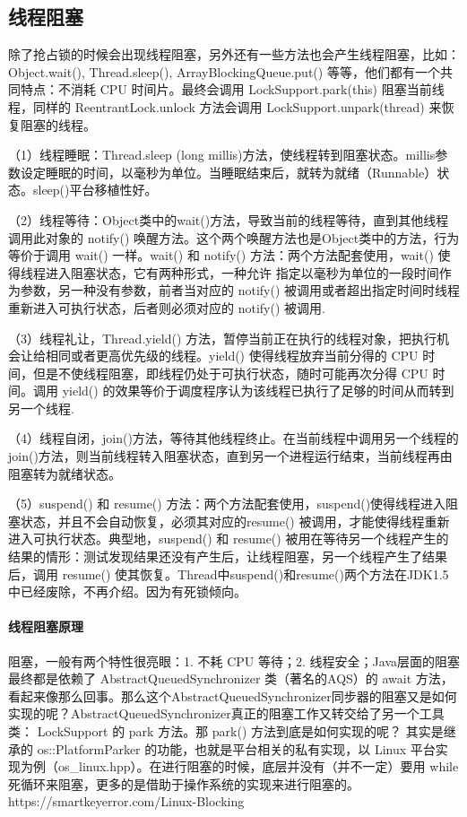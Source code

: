 \documentclass[../../../interview-questions.tex]{subfiles}
\begin{document}
\subsection{线程阻塞}

除了抢占锁的时候会出现线程阻塞，另外还有一些方法也会产生线程阻塞，比如： Object.wait(), Thread.sleep(), ArrayBlockingQueue.put() 等等，他们都有一个共同特点：不消耗 CPU 时间片。最终会调用 LockSupport.park(this) 阻塞当前线程，同样的 ReentrantLock.unlock 方法会调用 LockSupport.unpark(thread) 来恢复阻塞的线程。

（1）线程睡眠：Thread.sleep (long millis)方法，使线程转到阻塞状态。millis参数设定睡眠的时间，以毫秒为单位。当睡眠结束后，就转为就绪（Runnable）状态。sleep()平台移植性好。

（2）线程等待：Object类中的wait()方法，导致当前的线程等待，直到其他线程调用此对象的 notify() 唤醒方法。这个两个唤醒方法也是Object类中的方法，行为等价于调用 wait() 一样。wait() 和 notify() 方法：两个方法配套使用，wait() 使得线程进入阻塞状态，它有两种形式，一种允许 指定以毫秒为单位的一段时间作为参数，另一种没有参数，前者当对应的 notify() 被调用或者超出指定时间时线程重新进入可执行状态，后者则必须对应的 notify() 被调用.

（3）线程礼让，Thread.yield() 方法，暂停当前正在执行的线程对象，把执行机会让给相同或者更高优先级的线程。yield() 使得线程放弃当前分得的 CPU 时间，但是不使线程阻塞，即线程仍处于可执行状态，随时可能再次分得 CPU 时间。调用 yield() 的效果等价于调度程序认为该线程已执行了足够的时间从而转到另一个线程.

（4）线程自闭，join()方法，等待其他线程终止。在当前线程中调用另一个线程的join()方法，则当前线程转入阻塞状态，直到另一个进程运行结束，当前线程再由阻塞转为就绪状态。

（5）suspend() 和 resume() 方法：两个方法配套使用，suspend()使得线程进入阻塞状态，并且不会自动恢复，必须其对应的resume() 被调用，才能使得线程重新进入可执行状态。典型地，suspend() 和 resume() 被用在等待另一个线程产生的结果的情形：测试发现结果还没有产生后，让线程阻塞，另一个线程产生了结果后，调用 resume() 使其恢复。Thread中suspend()和resume()两个方法在JDK1.5中已经废除，不再介绍。因为有死锁倾向。

\paragraph{线程阻塞原理}

阻塞，一般有两个特性很亮眼：1. 不耗 CPU 等待；2. 线程安全；Java层面的阻塞最终都是依赖了 AbstractQueuedSynchronizer 类（著名的AQS）的 await 方法，看起来像那么回事。那么这个AbstractQueuedSynchronizer同步器的阻塞又是如何实现的呢？AbstractQueuedSynchronizer真正的阻塞工作又转交给了另一个工具类： LockSupport 的 park 方法。那 park() 方法到底是如何实现的呢？ 其实是继承的 os::PlatformParker 的功能，也就是平台相关的私有实现，以 Linux 平台实现为例（os\_linux.hpp）。在进行阻塞的时候，底层并没有（并不一定）要用 while 死循环来阻塞，更多的是借助于操作系统的实现来进行阻塞的。https://smartkeyerror.com/Linux-Blocking
\end{document}
